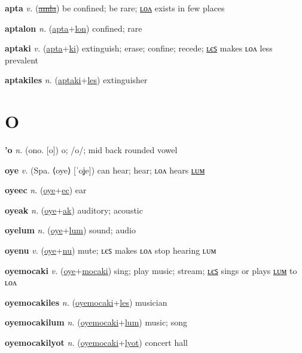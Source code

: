 \textbf{\hypertarget{apta}{apta}} \textit{v.} (\hyperlink{amla}{\sout{amla}})
be confined; be rare; \hyperlink{aptalon}{ʟᴏᴧ} exists in few places

\textbf{\hypertarget{aptalon}{aptalon}} \textit{n.} (\hyperlink{apta}{apta}+\allowbreak \hyperlink{lon}{lon})
confined; rare

\textbf{\hypertarget{aptaki}{aptaki}} \textit{v.} (\hyperlink{apta}{apta}+\allowbreak \hyperlink{ki}{ki})
extinguish; erase; confine; recede; \hyperlink{aptakiles}{ʟєꜱ} makes ʟᴏᴧ less prevalent

\textbf{\hypertarget{aptakiles}{aptakiles}} \textit{n.} (\hyperlink{aptaki}{aptaki}+\allowbreak \hyperlink{les}{les})
extinguisher

\section{O}

\textbf{\hypertarget{'o}{'o}} \textit{n.} (ono. [o])
o; /o/; mid back rounded vowel

\textbf{\hypertarget{oye}{oye}} \textit{v.} (Spa. ⟨oye⟩ [ˈoʝe])
can hear; hear; ʟᴏᴧ hears \hyperlink{oyelum}{ʟᴜᴍ}

\textbf{\hypertarget{oyeec}{oyeec}} \textit{n.} (\hyperlink{oye}{oye}+\allowbreak \hyperlink{ec}{ec})
ear

\textbf{\hypertarget{oyeak}{oyeak}} \textit{n.} (\hyperlink{oye}{oye}+\allowbreak \hyperlink{ak}{ak})
auditory; acoustic

\textbf{\hypertarget{oyelum}{oyelum}} \textit{n.} (\hyperlink{oye}{oye}+\allowbreak \hyperlink{lum}{lum})
sound; audio

\textbf{\hypertarget{oyenu}{oyenu}} \textit{v.} (\hyperlink{oye}{oye}+\allowbreak \hyperlink{nu}{nu})
mute; ʟєꜱ makes ʟᴏᴧ stop hearing ʟᴜᴍ

\textbf{\hypertarget{oyemocaki}{oyemocaki}} \textit{v.} (\hyperlink{oye}{oye}+\allowbreak \hyperlink{mocaki}{mocaki})
sing; play music; stream; \hyperlink{oyemocakiles}{ʟєꜱ} sings or plays \hyperlink{oyemocakilum}{ʟᴜᴍ} to ʟᴏᴧ

\textbf{\hypertarget{oyemocakiles}{oyemocakiles}} \textit{n.} (\hyperlink{oyemocaki}{oyemocaki}+\allowbreak \hyperlink{les}{les})
musician

\textbf{\hypertarget{oyemocakilum}{oyemocakilum}} \textit{n.} (\hyperlink{oyemocaki}{oyemocaki}+\allowbreak \hyperlink{lum}{lum})
music; song

\textbf{\hypertarget{oyemocakilyot}{oyemocakilyot}} \textit{n.} (\hyperlink{oyemocaki}{oyemocaki}+\allowbreak \hyperlink{lyot}{lyot})
concert hall

